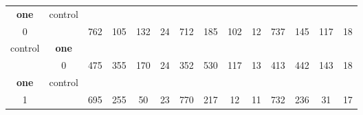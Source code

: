 \begin{table}[H]
{\begin{tabular}{|c|c|c|c|c|c|c|c|c|c|c|c|c|c|}
\cellcolor{blue!15}\textbf{one} & control& {\color[HTML]{00009B} } & {\color[HTML]{9A0000} } & {\color[HTML]{009901} } &  & {\color[HTML]{00009B} } & {\color[HTML]{9A0000} } & {\color[HTML]{009901} } &  & {\color[HTML]{00009B} } & {\color[HTML]{9A0000} } & {\color[HTML]{009901} } &  \\ 
\cellcolor{ blue!15}0 &  & \multirow{-2}{*}{{\color[HTML]{00009B} 762}} & \multirow{-2}{*}{{\color[HTML]{9A0000} 105}} & \multirow{-2}{*}{{\color[HTML]{009901} 132}} & \multirow{-2}{*}{24} & \multirow{-2}{*}{{\color[HTML]{00009B} 712}} & \multirow{-2}{*}{{\color[HTML]{9A0000} 185}} & \multirow{-2}{*}{{\color[HTML]{009901} 102}} & \multirow{-2}{*}{12} & \multirow{-2}{*}{{\color[HTML]{00009B} 737}} & \multirow{-2}{*}{{\color[HTML]{9A0000} 145}} & \multirow{-2}{*}{{\color[HTML]{009901} 117}} & \multirow{-2}{*}{18} \\ \hline

control & \cellcolor{blue!15}\textbf{one}& {\color[HTML]{00009B} } & {\color[HTML]{9A0000} } & {\color[HTML]{009901} } &  & {\color[HTML]{00009B} } & {\color[HTML]{9A0000} } & {\color[HTML]{009901} } &  & {\color[HTML]{00009B} } & {\color[HTML]{9A0000} } & {\color[HTML]{009901} } &  \\ 
 & \cellcolor{ blue!15}0 & \multirow{-2}{*}{{\color[HTML]{00009B} 475}} & \multirow{-2}{*}{{\color[HTML]{9A0000} 355}} & \multirow{-2}{*}{{\color[HTML]{009901} 170}} & \multirow{-2}{*}{24} & \multirow{-2}{*}{{\color[HTML]{00009B} 352}} & \multirow{-2}{*}{{\color[HTML]{9A0000} 530}} & \multirow{-2}{*}{{\color[HTML]{009901} 117}} & \multirow{-2}{*}{13} & \multirow{-2}{*}{{\color[HTML]{00009B} 413}} & \multirow{-2}{*}{{\color[HTML]{9A0000} 442}} & \multirow{-2}{*}{{\color[HTML]{009901} 143}} & \multirow{-2}{*}{18} \\ \hline

\cellcolor{blue!15}\textbf{one} & control& {\color[HTML]{00009B} } & {\color[HTML]{9A0000} } & {\color[HTML]{009901} } &  & {\color[HTML]{00009B} } & {\color[HTML]{9A0000} } & {\color[HTML]{009901} } &  & {\color[HTML]{00009B} } & {\color[HTML]{9A0000} } & {\color[HTML]{009901} } &  \\ 
\cellcolor{ blue!15}1 &  & \multirow{-2}{*}{{\color[HTML]{00009B} 695}} & \multirow{-2}{*}{{\color[HTML]{9A0000} 255}} & \multirow{-2}{*}{{\color[HTML]{009901} 50}} & \multirow{-2}{*}{23} & \multirow{-2}{*}{{\color[HTML]{00009B} 770}} & \multirow{-2}{*}{{\color[HTML]{9A0000} 217}} & \multirow{-2}{*}{{\color[HTML]{009901} 12}} & \multirow{-2}{*}{11} & \multirow{-2}{*}{{\color[HTML]{00009B} 732}} & \multirow{-2}{*}{{\color[HTML]{9A0000} 236}} & \multirow{-2}{*}{{\color[HTML]{009901} 31}} & \multirow{-2}{*}{17} \\ \hline


\end{tabular}}
\end{table}
